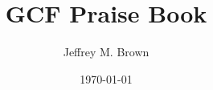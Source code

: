 \documentclass[11pt, twoside]{article}
\title{GCF Praise Book}
\author{Jeffrey M. Brown}
\date{\today}
\begin{document}
\begin{multicols}{2}
  
\end{multicols}
\end{document}
